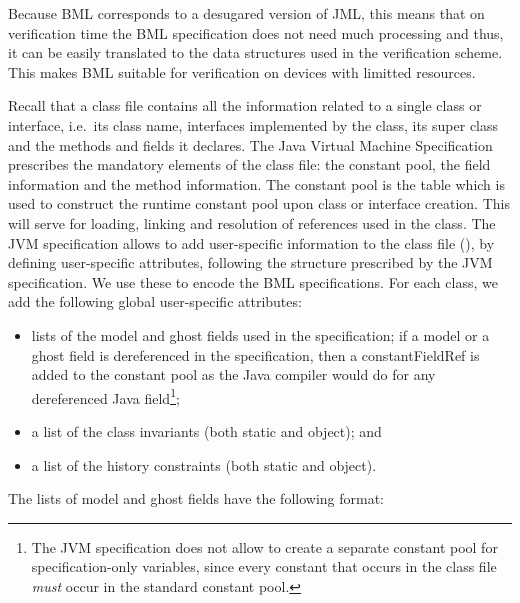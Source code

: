 \documentclass[a4paper]{llncs}
\begin{document}
\begin{itemize}

      Because BML corresponds to a desugared version of JML, this
      means that on verification time the BML specification does not
      need much processing and thus, it can be easily translated to
      the data structures used in the verification scheme. This makes
      BML suitable for verification on devices with limitted
      resources.
      
\end{itemize}


Recall that a class file contains all the information related to a
single class or interface, i.e.~its class name, interfaces
implemented by the class, its super class and the methods and fields
it declares. The Java Virtual Machine Specification~\cite{JVMspec} 
prescribes the mandatory elements of the class
file: the constant pool, the field information and the method
information. The constant pool is the table which is used to construct
the runtime constant pool upon class or interface creation. This will
serve for loading, linking and resolution of references used in the
class. The JVM specification allows to add user-specific information to the 
class
file (\cite[\S4.7.1]{JVMspec}), by defining user-specific attributes,
following the structure prescribed by the JVM specification. 
We use these to encode
the BML specifications. For each class, we add the following global
user-specific attributes:
\begin{itemize}
\item lists of the model and ghost fields used in the specification;
if a model or a ghost field is dereferenced in the specification, then
a constantFieldRef is added to the constant pool as the Java compiler
would do for any dereferenced Java field\footnote{The JVM
specification does not
allow to create a separate constant pool for specification-only
variables, since every constant that occurs in the class file
\emph{must} occur in the standard constant pool.};
\item a list of the class invariants (both static and object); and
\item a list of the history constraints (both static and object).
\end{itemize}

The lists of model and ghost fields have the following format:\\ 
\end{document}
